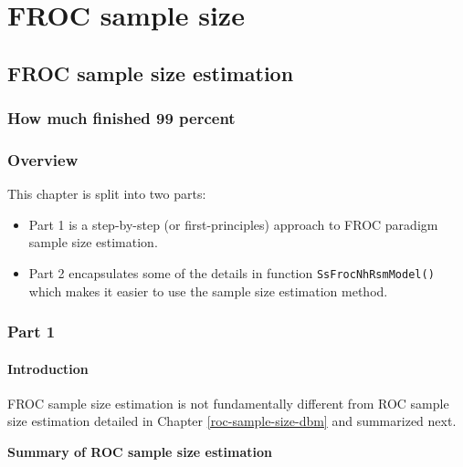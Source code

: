 \documentclass[
]{book}
\begin{document}
\hypertarget{part-froc-sample-size}{%
\part*{FROC sample size}\label{part-froc-sample-size}}

\hypertarget{froc-sample-size}{%
\chapter{FROC sample size estimation}\label{froc-sample-size}}

\hypertarget{froc-sample-size-how-much-finished}{%
\section{How much finished 99 percent}\label{froc-sample-size-how-much-finished}}

\hypertarget{overview}{%
\section{Overview}\label{overview}}

This chapter is split into two parts:

\begin{itemize}
\item
  Part 1 is a step-by-step (or first-principles) approach to FROC paradigm sample size estimation.
\item
  Part 2 encapsulates some of the details in function \texttt{SsFrocNhRsmModel()} which makes it easier to use the sample size estimation method.
\end{itemize}

\hypertarget{part-1}{%
\section{Part 1}\label{part-1}}

\hypertarget{froc-sample-size-intro}{%
\subsection{Introduction}\label{froc-sample-size-intro}}

FROC sample size estimation is not fundamentally different from ROC sample size estimation detailed in Chapter \ref{roc-sample-size-dbm} and summarized next.

\textbf{Summary of ROC sample size estimation}
\end{document}
